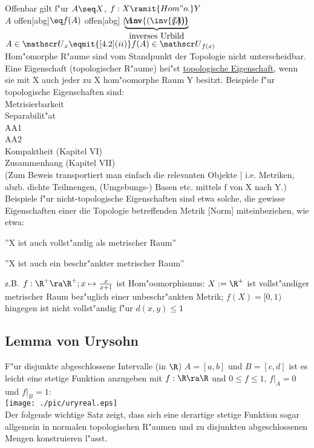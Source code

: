 Offenbar gilt f"ur $A\seq X$, $f:X\ramit{Hom"o.}Y$\\
$A$ offen[abg]$\eq f(A)$ offen[abg] ($A=\hspace*{-0.8cm}\underbrace{\inv{(\inv{f})}}_{\mbox{inverses Urbild}}\hspace*{-0.7cm}(A))$\vspace*{-0.5cm}\\
$A\in\umg{U}{x}\eqmit{\ref{4.2}(ii)}f(A)\in\umg{U}{f(x)}$\vspace*{0.5cm}\\
Hom"omorphe R"aume sind vom Standpunkt der Topologie nicht unterscheidbar.\vspace*{0.5cm}\\
Eine Eigenschaft (topologischer R"aume) hei"st \ul{topologische Eigenschaft}, wenn sie mit X auch jeder zu X hom"oomorphe Raum Y besitzt. Beispiele f"ur topologische Eigenschaften sind:\\
\hspace*{2cm}Metrisierbarkeit\\
\hspace*{2cm}Separabilit"at\\
\hspace*{2cm}AA1\\
\hspace*{2cm}AA2\\
\hspace*{2cm}Kompaktheit (Kapitel VI)\\
\hspace*{2cm}Zusammenhang (Kapitel VII)\\
(Zum Beweis transportiert man einfach die relevanten Objekte | i.e. Metriken, abzb. dichte Teilmengen, (Umgebungs-) Basen etc. mittels f von X nach Y.)\\
Beispiele f"ur nicht-topologische Eigenschaften sind etwa solche, die gewisse Eigenschaften einer die Topologie betreffenden Metrik [Norm] miteinbeziehen, wie etwa:
\begin{description}
\item ''X ist auch vollst"andig als metrischer Raum''
\item ''X ist auch ein beschr"ankter metrischer Raum''
\end{description}
z.B. $f:\R^+\ra\R^+ ; x\mapsto \frac{x}{x+1}$ ist Hom"oomorphismus: $X:= \R^+$ ist vollst"andiger metrischer Raum bez"uglich einer unbeschr"ankten Metrik; $f(X) =[0,1)$ hingegen ist nicht vollst"andig f"ur $d(x,y)\leq1$
\newpage
\subsection{Lemma von {\sc Urysohn}}
F"ur disjunkte abgeschlossene Intervalle (in $\R$) $A=[a,b]$ und $B=[c,d]$ ist es leicht eine stetige Funktion anzugeben mit $f:\R\ra\R$ und $0\leq f\leq 1$, $f|_A =0$ und $f|_B=1$:\\
\hspace*{4.5cm}\texttt{[image: ./pic/uryreal.eps]}\\
Der folgende wichtige Satz zeigt, dass sich eine derartige stetige Funktion sogar allgemein in normalen topologischen R"aumen und zu disjunkten abgeschlossenen Mengen konstruieren l"asst.

